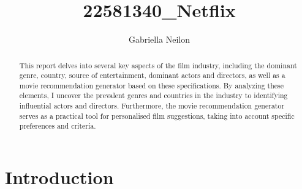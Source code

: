 \documentclass[11pt,preprint, authoryear]{elsarticle}
\numberwithin{equation}{section}
\numberwithin{figure}{section}
\numberwithin{table}{section}
\begin{document}
\begin{frontmatter}  %

\title{22581340\_Netflix}





\author[Add1]{Gabriella Neilon}





\address[Add1]{Stellenbosch University}


\begin{abstract}
\small{
This report delves into several key aspects of the film industry,
including the dominant genre, country, source of entertainment, dominant
actors and directors, as well as a movie recommendation generator based
on these specifications. By analyzing these elements, I uncover the
prevalent genres and countries in the industry to identifying
influential actors and directors. Furthermore, the movie recommendation
generator serves as a practical tool for personalised film suggestions,
taking into account specific preferences and criteria.
}
\end{abstract}

\vspace{1cm}





\vspace{0.5cm}

\end{frontmatter}

\setcounter{footnote}{0}



\pagestyle{fancy}
\chead{}
\rhead{}
\lfoot{}
\lhead{}
\cfoot{}


\headsep 35pt %




\hypertarget{introduction}{%
\section{\texorpdfstring{Introduction
\label{Introduction}}{Introduction }}\label{introduction}}
\end{document}
